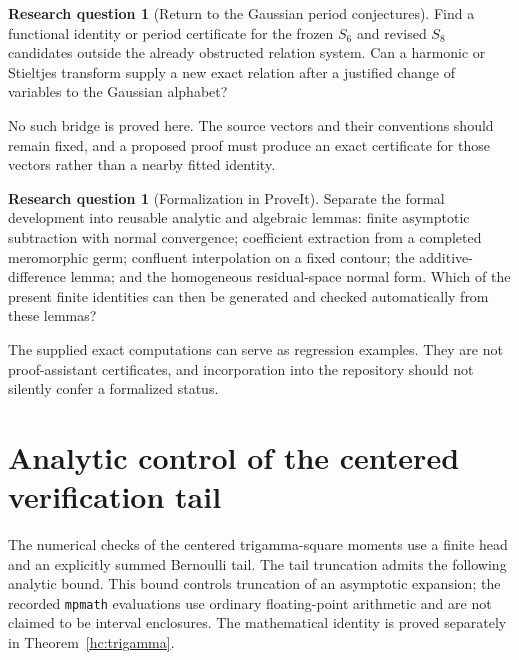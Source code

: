 \documentclass[11pt]{article}
\numberwithin{equation}{section}
\theoremstyle{definition}
\newtheorem{question}[theorem]{Research question}
\theoremstyle{remark}
\begin{document}
\begin{question}[Return to the Gaussian period conjectures]
Find a functional identity or period certificate for the frozen $S_6$
and revised $S_8$ candidates outside the already obstructed relation
system. Can a harmonic or Stieltjes transform supply a new exact
relation after a justified change of variables to the Gaussian alphabet?
\end{question}
No such bridge is proved here. The source vectors and their conventions
should remain fixed, and a proposed proof must produce an exact
certificate for those vectors rather than a nearby fitted identity.

\begin{question}[Formalization in ProveIt]
Separate the formal development into reusable analytic and algebraic
lemmas: finite asymptotic subtraction with normal convergence;
coefficient extraction from a completed meromorphic germ; confluent
interpolation on a fixed contour; the additive-difference lemma; and
the homogeneous residual-space normal form. Which of the present
finite identities can then be generated and checked automatically from
these lemmas?
\end{question}
The supplied exact computations can serve as regression examples. They
are not proof-assistant certificates, and incorporation into the
repository should not silently confer a formalized status.

\appendix
\section{Analytic control of the centered verification tail}
\label{hc:verification-bound}

The numerical checks of the centered trigamma-square moments use a finite
head and an explicitly summed Bernoulli tail. The tail truncation admits
the following analytic bound. This bound controls truncation of an
asymptotic expansion; the recorded \texttt{mpmath} evaluations use ordinary
floating-point arithmetic and are not claimed to be interval enclosures.
The mathematical identity is proved separately in
Theorem~\ref{hc:trigamma}.
\end{document}
